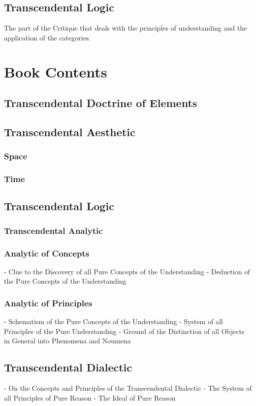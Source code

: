 \documentclass[a4paper]{article}
\begin{document}
\subsection{Transcendental Logic}
The part of the Critique that deals with the principles of understanding and the application of the categories.

\section{Book Contents}
\subsection{Transcendental Doctrine of Elements}
\subsection{Transcendental Aesthetic}
\subsubsection{Space}
\subsubsection{Time}

\subsection{Transcendental Logic}
\subsubsection{Transcendental Analytic}
\subsubsection{Analytic of Concepts}
- Clue to the Discovery of all Pure Concepts of the Understanding
- Deduction of the Pure Concepts of the Understanding

\subsubsection{Analytic of Principles}
- Schematism of the Pure Concepts of the Understanding
- System of all Principles of the Pure Understanding
- Ground of the Distinction of all Objects in General into Phenomena and Noumena

\subsection{Transcendental Dialectic}
- On the Concepts and Principles of the Transcendental Dialectic
- The System of all Principles of Pure Reason
- The Ideal of Pure Reason
\end{document}
